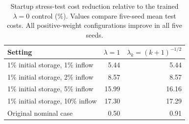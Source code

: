 \begin{table}[ht]
\caption{Startup stress-test cost reduction relative to the trained
$\lambda=0$ control (\%). Values compare five-seed mean test costs.
All positive-weight configurations improve in all five seeds.}
\label{tab:proposal-distance-stress}
\centering
\small
\begin{tabular}{@{}lrr@{}}
\toprule
Setting & $\lambda=1$ & $\lambda_k=(k+1)^{-1/2}$\\
\midrule
1\% initial storage, 1\% inflow & 5.44 & 5.44\\
1\% initial storage, 2\% inflow & 8.57 & 8.57\\
1\% initial storage, 5\% inflow & 15.99 & 16.16\\
1\% initial storage, 10\% inflow & 17.30 & 17.29\\
Original nominal case & 0.50 & 0.91\\
\bottomrule
\end{tabular}
\end{table}
